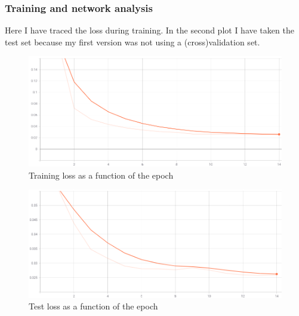 \documentclass{article}
\begin{document}
\subsubsection{Training and network analysis}
Here I have traced the loss during training. In the second plot I have taken the test set because my first version was not using a (cross)validation set.
\begin{figure}[H]
    \includegraphics[width=\linewidth]{mnist_task/imgs/train_loss.png}
    \caption{Training loss as a function of the epoch}\label{conv1}
\end{figure}
\begin{figure}[H]
    \includegraphics[width=\linewidth]{mnist_task/imgs/test_loss.png}
    \caption{Test loss as a function of the epoch}\label{conv1}
\end{figure}
\end{document}
